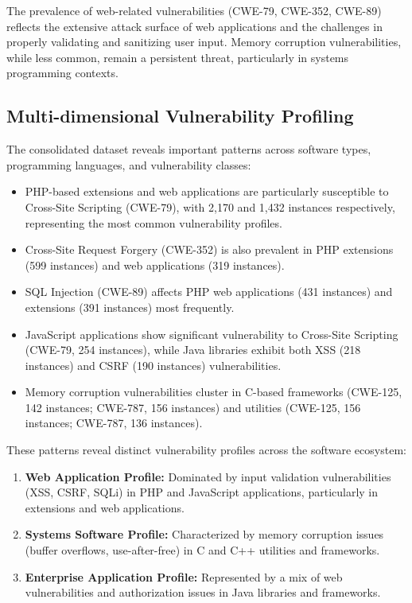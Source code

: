 The prevalence of web-related vulnerabilities (CWE-79, CWE-352, CWE-89) reflects the extensive attack surface of web applications and the challenges in properly validating and sanitizing user input. Memory corruption vulnerabilities, while less common, remain a persistent threat, particularly in systems programming contexts.

\subsection{Multi-dimensional Vulnerability Profiling}

The consolidated dataset reveals important patterns across software types, programming languages, and vulnerability classes:

\begin{itemize}
    \item PHP-based extensions and web applications are particularly susceptible to Cross-Site Scripting (CWE-79), with 2,170 and 1,432 instances respectively, representing the most common vulnerability profiles.
    \item Cross-Site Request Forgery (CWE-352) is also prevalent in PHP extensions (599 instances) and web applications (319 instances).
    \item SQL Injection (CWE-89) affects PHP web applications (431 instances) and extensions (391 instances) most frequently.
    \item JavaScript applications show significant vulnerability to Cross-Site Scripting (CWE-79, 254 instances), while Java libraries exhibit both XSS (218 instances) and CSRF (190 instances) vulnerabilities.
    \item Memory corruption vulnerabilities cluster in C-based frameworks (CWE-125, 142 instances; CWE-787, 156 instances) and utilities (CWE-125, 156 instances; CWE-787, 136 instances).
\end{itemize}

These patterns reveal distinct vulnerability profiles across the software ecosystem:

\begin{enumerate}
    \item \textbf{Web Application Profile:} Dominated by input validation vulnerabilities (XSS, CSRF, SQLi) in PHP and JavaScript applications, particularly in extensions and web applications.
    \item \textbf{Systems Software Profile:} Characterized by memory corruption issues (buffer overflows, use-after-free) in C and C++ utilities and frameworks.
    \item \textbf{Enterprise Application Profile:} Represented by a mix of web vulnerabilities and authorization issues in Java libraries and frameworks.
\end{enumerate}

